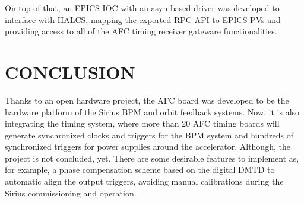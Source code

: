 \documentclass[a4paper,
               biblatex,      %
               ]{jacow}
\begin{document}
On top of that, an EPICS IOC with an asyn-based driver was developed to interface with HALCS, mapping the exported RPC API to EPICS PVs and providing access to all of the AFC timing receiver gateware functionalities.

\section{CONCLUSION}

Thanks to an open hardware project, the AFC board was developed to be the hardware platform of the Sirius BPM and orbit feedback systems. Now, it is also integrating the timing system, where more than 20 AFC timing boards will generate synchronized clocks and triggers for the BPM system and hundreds of synchronized triggers for power supplies around the accelerator. Although, the project is not concluded, yet. There are some desirable features to implement as, for example, a phase compensation scheme based on the digital DMTD to automatic align the output triggers, avoiding manual calibrations during the Sirius commissioning and operation. 

\printbibliography
\newpage
\end{document}
